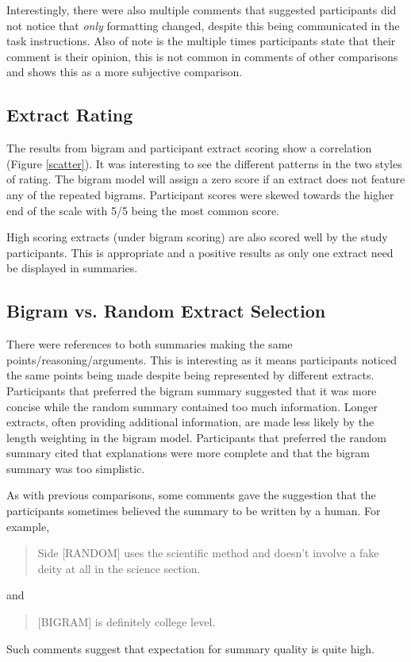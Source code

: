       Interestingly, there were also multiple comments that suggested participants did not notice that \textit{only} formatting changed, despite this being communicated in the task instructions. Also of note is the multiple times participants state that their comment is their opinion, this is not common in comments of other comparisons and shows this as a more subjective comparison.

    \tocless\subsection{Extract Rating}
      The results from bigram and participant extract scoring show a correlation (Figure \ref{scatter}). It was interesting to see the different patterns in the two styles of rating. The bigram model will assign a zero score if an extract does not feature any of the repeated bigrams. Participant scores were skewed towards the higher end of the scale with 5/5 being the most common score.

      High scoring extracts (under bigram scoring) are also scored well by the study participants. This is appropriate and a positive results as only one extract need be displayed in summaries.

    \tocless\subsection{Bigram vs. Random Extract Selection}
      There were references to both summaries making the same points/reasoning/arguments. This is interesting as it means participants noticed the same points being made despite being represented by different extracts. Participants that preferred the bigram summary suggested that it was more concise while the random summary contained too much information. Longer extracts, often providing additional information, are made less likely by the length weighting in the bigram model. Participants that preferred the random summary cited that explanations were more complete and that the bigram summary was too simplistic.

      As with previous comparisons, some comments gave the suggestion that the participants sometimes believed the summary to be written by a human. For example, \blockquote{Side [RANDOM] uses the scientific method and doesn't involve a fake deity at all in the science section.} and \blockquote{[BIGRAM] is definitely college level.}. Such comments suggest that expectation for summary quality is quite high.

